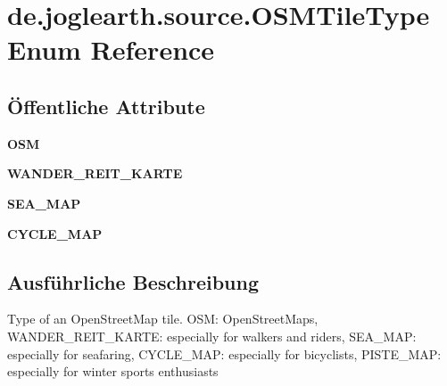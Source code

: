 \section{de.\-joglearth.\-source.\-O\-S\-M\-Tile\-Type \-Enum \-Reference}
\label{enumde_1_1joglearth_1_1source_1_1_o_s_m_tile_type}
\subsection*{Öffentliche \-Attribute}
\begin{DoxyCompactItemize}
\item 
{\bfseries \-O\-S\-M}\label{enumde_1_1joglearth_1_1source_1_1_o_s_m_tile_type_aacf367dadcfa86d07000e050157ae264}

\item 
{\bfseries \-W\-A\-N\-D\-E\-R\-\_\-\-R\-E\-I\-T\-\_\-\-K\-A\-R\-T\-E}\label{enumde_1_1joglearth_1_1source_1_1_o_s_m_tile_type_ae78e179d37c4796ca6047f115704a7b0}

\item 
{\bfseries \-S\-E\-A\-\_\-\-M\-A\-P}\label{enumde_1_1joglearth_1_1source_1_1_o_s_m_tile_type_a01f418a3c2d870dc7b2326fd1106412c}

\item 
{\bfseries \-C\-Y\-C\-L\-E\-\_\-\-M\-A\-P}\label{enumde_1_1joglearth_1_1source_1_1_o_s_m_tile_type_aff2af2413039c3821a05f160ebeebc62}

\end{DoxyCompactItemize}


\subsection{\-Ausführliche \-Beschreibung}
\-Type of an \-Open\-Street\-Map tile. \-O\-S\-M\-: \-Open\-Street\-Maps, \-W\-A\-N\-D\-E\-R\-\_\-\-R\-E\-I\-T\-\_\-\-K\-A\-R\-T\-E\-: especially for walkers and riders, \-S\-E\-A\-\_\-\-M\-A\-P\-: especially for seafaring, \-C\-Y\-C\-L\-E\-\_\-\-M\-A\-P\-: especially for bicyclists, \-P\-I\-S\-T\-E\-\_\-\-M\-A\-P\-: especially for winter sports enthusiasts 